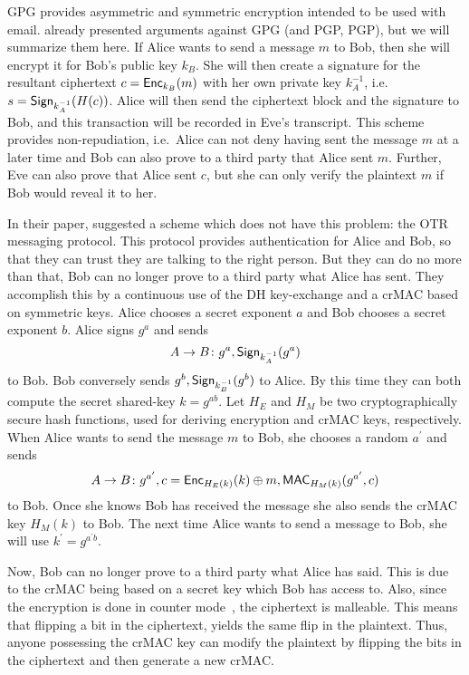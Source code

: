 \ac{GPG} provides asymmetric and symmetric encryption intended to be used with 
email.
\citet{otr2004} already presented arguments against \ac{GPG} (and \acl{PGP}, 
\acs{PGP}), but we will summarize them here.
If Alice wants to send a message \(m\) to Bob, then she will encrypt it for 
Bob's public key \(k_B\).
She will then create a signature for the resultant ciphertext \(c = \operatorname{\mathsf{Enc}}_{k_B}( 
m )\) with her own private key \(k_A^{-1}\), i.e.~\(s = \operatorname{\mathsf{Sign}}_{k_A^{-1}}( H(c) 
)\).
Alice will then send the ciphertext block and the signature to Bob, and this 
transaction will be recorded in Eve's transcript.
This scheme provides non-repudiation, i.e.~Alice can not deny having sent the 
message \(m\) at a later time and Bob can also prove to a third party that 
Alice sent \(m\).
Further, Eve can also prove that Alice sent \(c\), but she can only verify the 
plaintext \(m\) if Bob would reveal it to her.

In their paper, \citet{otr2004} suggested a scheme which does not have this 
problem: the \ac{OTR} messaging protocol.
This protocol provides authentication for Alice and Bob, so that they can trust 
they are talking to the right person.
But they can do no more than that, Bob can no longer prove to a third party 
what Alice has sent.
They accomplish this by a continuous use of the \ac{DH} key-exchange and 
a \ac{crMAC} based on symmetric keys.
Alice chooses a secret exponent \(a\) and Bob chooses a secret exponent \(b\).
Alice signs \(g^a\) and sends \[
  A\to B\colon g^a, \operatorname{\mathsf{Sign}}_{k_A^{-1}}( g^a )
\] to Bob.
Bob conversely sends \(g^b, \operatorname{\mathsf{Sign}}_{k_B^{-1}}( g^b )\) to Alice.
By this time they can both compute the secret shared-key \(k = g^{ab}\).
Let \(H_E\) and \(H_M\) be two cryptographically secure hash functions, used 
for deriving encryption and \ac{crMAC} keys, respectively.
When Alice wants to send the message \(m\) to Bob, she chooses a random 
\(a^\prime\) and sends \[
  A\to B\colon g^{a^\prime}, c = \operatorname{\mathsf{Enc}}_{H_E( k )}( k )\oplus m,
  \operatorname{\mathsf{MAC}}_{H_M( k )}( g^{a^\prime}, c )
\] to Bob.
Once she knows Bob has received the message she also sends the \ac{crMAC} key 
\(H_M( k )\) to Bob.
The next time Alice wants to send a message to Bob, she will use \(k^\prime 
= g^{a^\prime b}\).

Now, Bob can no longer prove to a third party what Alice has said.
This is due to the \ac{crMAC} being based on a secret key which Bob has access 
to.
Also, since the encryption is done in counter mode~\cite{blockmodes}, the 
ciphertext is malleable.
This means that flipping a bit in the ciphertext, yields the same flip in the 
plaintext.
Thus, anyone possessing the \ac{crMAC} key can modify the plaintext by flipping 
the bits in the ciphertext and then generate a new \ac{crMAC}.

